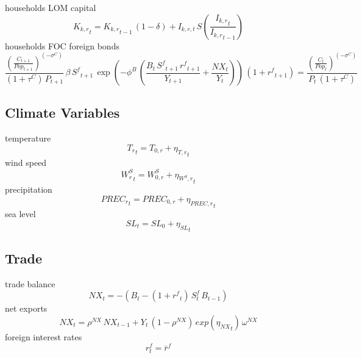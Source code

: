 households LOM capital
\begin{dmath}
{{K_{k,r}}_{t}}={{K_{k,r}}_{t-1}}\, \left(1-{{\delta}}\right) + I_{k,r,t} \, S\left(\frac{{{I_{k,r}}_{t}}}{{{I_{k,r}}_{t-1}}}\right)
\end{dmath}
households FOC foreign bonds
\begin{dmath}
\frac{\left(\frac{{C}_{t+1}}{{Pop}_{t+1}}\right)^{\left(-{{\sigma^{C}}}\right)}}{\left(1+{{\tau^{C}}}\right)\, {P}_{t+1}}\, {{\beta}}\, {S^{f}}_{t+1}\, \exp\left(-\phi^{B}\, \left(\frac{{B}_{t}\, {S^{f}}_{t+1}\, {{r^{f}}}_{t+1}}{{Y}_{t+1}}+\frac{{NX}_{t}}{{Y}_{t}}\right)\right)\, \left(1+{{r^{f}}}_{t+1}\right)=\frac{\left(\frac{{C}_{t}}{{Pop}_{t}}\right)^{\left(-{{\sigma^{C}}}\right)}}{{P}_{t}\, \left(1+{{\tau^{C}}}\right)}
\end{dmath}

\subsection{Climate Variables}
temperature
\begin{dmath}
{{T_{r}}_{t}}={{T_{0,r}}}+{{\eta_{T,r}}_{t}}
\end{dmath}
wind speed
\begin{dmath}
{{W_{r}^{S}}_{t}}={{W^{S}_{0,r}}}+{{\eta_{W^{S},r}}_{t}}
\end{dmath}
precipitation
\begin{dmath}
{{PREC_{r}}_{t}}={{PREC_{0,r}}}+{{\eta_{PREC,r}}_{t}}
\end{dmath}
sea level
\begin{dmath}
{{SL}_{t}}={{SL_0}}+{{\eta_{SL}}_{t}}
\end{dmath}

\subsection{Trade}
trade balance
\begin{dmath}
{NX_{t}}=-\left({B_{t}}-\left(1+{{r^{f}}_{t}}\right) \, S^{f}_{t} \, {B_{t-1}}\right)
\end{dmath}
net exports
\begin{dmath}
{NX_{t}}={{\rho^{NX}}}\, {NX_{t-1}}+{Y_{t}}\, \left(1-{{\rho^{NX}}}\right)\, exp\left({{\eta_{NX}}_{t}}\right)\, {{\omega^{NX}}}
\end{dmath}
foreign interest rates
\begin{dmath}
r^{f}_{t} = \bar{r}^{f}
\end{dmath}

